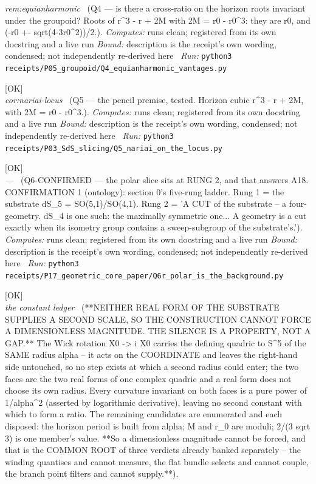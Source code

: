 \begin{description}
\textit{rem:equianharmonic} \ (Q4 --- is there a cross-ratio on the horizon roots invariant under the groupoid? Roots of r\textasciicircum{}3 - r + 2M with 2M = r0 - r0\textasciicircum{}3: they are r0, and (-r0 +- sqrt(4-3r0\textasciicircum{}2))/2.). 
\emph{Computes:} runs clean; registered from its own docstring and a live run
 \emph{Bound:} description is the receipt's own wording, condensed; not independently re-derived here
\ \emph{Run:} \texttt{python3 receipts/P05\_groupoid/Q4\_equianharmonic\_vantages.py}
\item[\label{rcpt:Q5_nariai_on_the_locus}\texttt{Q5\_nariai\_on\_the\_locus}]\hfill\textsf{[OK]}\\
\textit{cor:nariai-locus} \ (Q5 --- the pencil premise, tested. Horizon cubic r\textasciicircum{}3 - r + 2M, with 2M = r0 - r0\textasciicircum{}3.). 
\emph{Computes:} runs clean; registered from its own docstring and a live run
 \emph{Bound:} description is the receipt's own wording, condensed; not independently re-derived here
\ \emph{Run:} \texttt{python3 receipts/P03\_SdS\_slicing/Q5\_nariai\_on\_the\_locus.py}
\item[\label{rcpt:Q6r_polar_is_the_background}\texttt{Q6r\_polar\_is\_the\_background}]\hfill\textsf{[OK]}\\
\textit{---} \ (Q6-CONFIRMED --- the polar slice sits at RUNG 2, and that answers A18. CONFIRMATION 1 (ontology): section 0's five-rung ladder. Rung 1 = the substrate dS\_5 = SO(5,1)/SO(4,1). Rung 2 = 'A CUT of the substrate -- a four-geometry. dS\_4 is one such: the maximally symmetric one... A geometry is a cut exactly when its isometry group contains a sweep-subgroup of the substrate's.'). 
\emph{Computes:} runs clean; registered from its own docstring and a live run
 \emph{Bound:} description is the receipt's own wording, condensed; not independently re-derived here
\ \emph{Run:} \texttt{python3 receipts/P17\_geometric\_core\_paper/Q6r\_polar\_is\_the\_background.py}
\item[\label{rcpt:P17_no_second_scale_on_either_face}\texttt{P17\_no\_second\_scale\_on\_either\_face}]\hfill\textsf{[OK]}\\
\textit{the constant ledger} \ (**NEITHER REAL FORM OF THE SUBSTRATE SUPPLIES A SECOND SCALE, SO THE CONSTRUCTION CANNOT FORCE A DIMENSIONLESS MAGNITUDE. THE SILENCE IS A PROPERTY, NOT A GAP.** The Wick rotation X0 -> i X0 carries the defining quadric to S\textasciicircum{}5 of the SAME radius alpha -- it acts on the COORDINATE and leaves the right-hand side untouched, so no step exists at which a second radius could enter; the two faces are the two real forms of one complex quadric and a real form does not choose its own radius. Every curvature invariant on both faces is a pure power of 1/alpha\textasciicircum{}2 (asserted by logarithmic derivative), leaving no second constant with which to form a ratio. The remaining candidates are enumerated and each disposed: the horizon period is built from alpha; M and r\_0 are moduli; 2/(3 sqrt 3) is one member's value. **So a dimensionless magnitude cannot be forced, and that is the COMMON ROOT of three verdicts already banked separately -- the winding quantises and cannot measure, the flat bundle selects and cannot couple, the branch point filters and cannot supply.**). 

\end{description}
